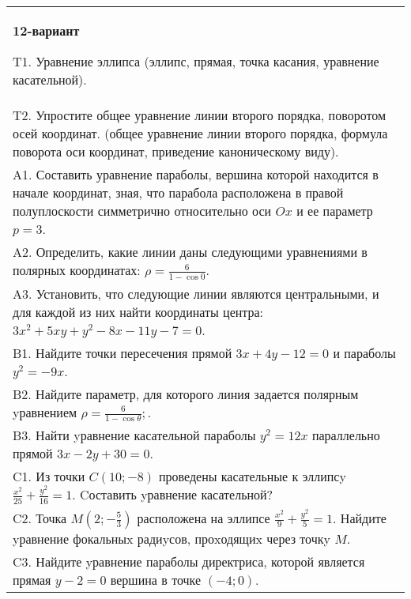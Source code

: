 \documentclass{article}
\begin{document}
\begin{tabular}{m{17cm}}
\textbf{12-вариант}
\newline

T1. Уравнение эллипса (эллипс, прямая, точка касания, уравнение касательной).\\

T2. Упростите общее уравнение линии второго порядка, поворотом осей координат. (общее уравнение линии второго порядка, формула поворота оси координат, приведение каноническому виду).\\

A1. Составить уравнение параболы, вершина которой находится в начале координат, зная, что парабола расположена в правой полуплоскости симметрично относительно оси $Ox$ и ее параметр $p=3$.\\

A2. Определить, какие линии даны следующими уравнениями в полярных координатах: $\rho=\frac{6}{1-\cos 0}$.\\

A3. Установить, что следующие линии являются центральными, и для каждой из них найти координаты центра: $3x^{2}+5xy+y^{2}-8x-11y-7=0$.\\

B1. Найдите точки пересечения прямой $3x + 4y - 12 = 0$ и параболы $y^{2} = - 9x$.  \\

B2. Найдите параметр, для которого линия задается полярным yравнением $\rho = \frac{6}{1 - \cos \theta};$.  \\

B3. Найти yравнение касательной параболы $y^{2} = 12x$ параллельно прямой $3x - 2y + 30 = 0$.  \\

C1. Из точки $C(10;-8)$ проведены касательные к эллипсy $\frac{x^{2}}{25}+\frac{y^{2}}{16}=1$. Cоставить yравнение касательной?  \\

C2. Точка $M(2;-\frac{5}{3})$ расположена на эллипсе $\frac{x^{2}}{9}+\frac{y^{2}}{5}=1$. Найдите yравнение фокальныx радиyсов, проxодящиx через точкy $M$.  \\

C3. Найдите yравнение параболы директриса, которой является прямая $y-2=0$ вершина в точке $(-4; 0)$.\\

\end{tabular}
\vspace{1cm}
\end{document}
